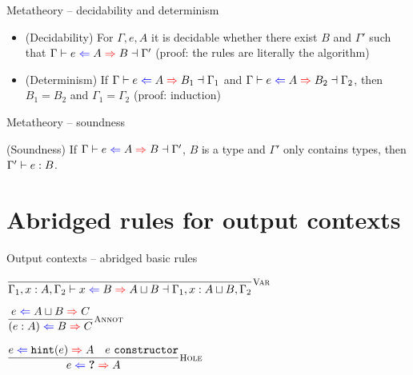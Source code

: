 \documentclass{beamer}
\begin{document}
\begin{frame}{Metatheory -- decidability and determinism}

\begin{itemize}
  \item (Decidability) For $\Gamma, e, A$ it is decidable whether there exist $B$ and $\Gamma'$ such that $\fulloutctx{\Gamma}{e}{A}{B}{\Gamma'}$ (proof: the rules are literally the algorithm)
  \item (Determinism) If $\fulloutctx{\Gamma}{e}{A}{B_1}{\Gamma_1}$ and $\fulloutctx{\Gamma}{e}{A}{B_2}{\Gamma_2}$, then $B_1 = B_2$ and $\Gamma_1 = \Gamma_2$ (proof: induction)
\end{itemize}

\end{frame}

\begin{frame}{Metatheory -- soundness}

(Soundness) If $\fulloutctx{\Gamma}{e}{A}{B}{\Gamma'}$, $B$ is a type and $\Gamma'$ only contains types, then $\Gamma' \vdash e : B$.

\end{frame}

\section{Abridged rules for output contexts}

\begin{frame}{Output contexts -- abridged basic rules}

\begin{center}
  $\infrule[Var]{}{\fulloutctx{\Gamma_1, x : A, \Gamma_2}{x}{B}{\hintlub{A}{B}}{\Gamma_1, x : \hintlub{A}{B}, \Gamma_2}}$

  \vspace{2em}

  $\infrule[Annot]{\shortoutctx{e}{\hintlub{A}{B}}{C}}{\shortoutctx{\annot{e}{A}}{B}{C}}$

  \vspace{2em}

  $\infrule[Hole]{\shortoutctx{e}{\hintfor{e}}{A} \quad \sidecond{e\ \texttt{constructor}}}{\shortoutctx{e}{\Hole}{A}}$
\end{center}

\end{frame}
\end{document}
